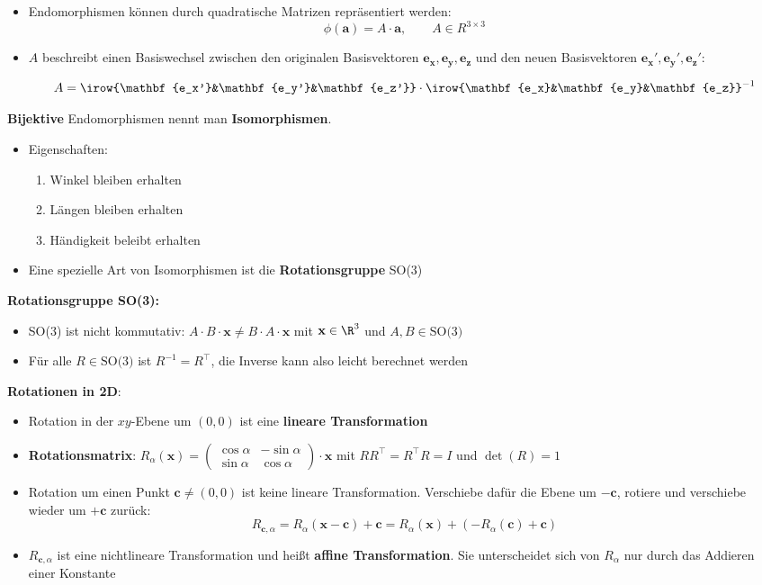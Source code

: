 \begin{itemize}
	\item Endomorphismen können durch quadratische Matrizen repräsentiert werden: $$\phi(\mathbf{a})=A\cdot\mathbf{a},\qquad A\in R^{3\times 3}$$
	\item $A$ beschreibt einen Basiswechsel zwischen den originalen Basisvektoren $\mathbf{e_x}, \mathbf{e_y}, \mathbf{e_z}$ und den neuen Basisvektoren $\mathbf{e_x'}, \mathbf{e_y'}, \mathbf{e_z'}$:
	
	$$A=\irow{\mathbf{e_x'}&\mathbf{e_y'}&\mathbf{e_z'}}\cdot\irow{\mathbf{e_x}&\mathbf{e_y}&\mathbf{e_z}}^{-1}$$
\end{itemize}
\pagebreak

\textbf{Bijektive} Endomorphismen nennt man \textbf{Isomorphismen}.
\begin{itemize}
	\item Eigenschaften:
	\begin{enumerate}
		\item Winkel bleiben erhalten
		\item Längen bleiben erhalten
		\item Händigkeit beleibt erhalten
	\end{enumerate}
	\item Eine spezielle Art von Isomorphismen ist die \textbf{Rotationsgruppe} SO(3)
\end{itemize}
\medskip
\textbf{Rotationsgruppe SO(3):}
\begin{itemize}
	\item SO(3) ist nicht kommutativ: $A\cdot B\cdot \mathbf{x}\neq B\cdot A\cdot \mathbf{x}$ mit $\mathbf{x}\in\R^3$ und $A,B\in\text{SO(3)}$ 
	\item Für alle $R\in\text{SO(3)}$ ist $R^{-1}=R^\top$, die Inverse kann also leicht berechnet werden
\end{itemize}
\medskip
\textbf{Rotationen in 2D}:
\begin{itemize}
	\item Rotation in der $xy$-Ebene um $(0,0)$ ist eine \textbf{lineare Transformation}
	\item \textbf{Rotationsmatrix}: $R_\alpha(\mathbf{x})=
	\left(\begin{matrix}
		\cos\alpha & -\sin\alpha \\
		\sin\alpha & \cos\alpha 
	\end{matrix}\right)\cdot\mathbf{x}$
	mit $RR^\top=R^\top R=I$ und $\det(R)=1$
	\item Rotation um einen Punkt $\mathbf{c}\neq(0,0)$ ist keine lineare Transformation.
	Verschiebe dafür die Ebene um $-\mathbf{c}$, rotiere und verschiebe wieder um $+\mathbf{c}$ zurück:
	$$R_{\mathbf{c},\alpha}=R_\alpha(\mathbf{x}-\mathbf{c})+\mathbf{c}= R_\alpha(\mathbf{x})+(-R_\alpha(\mathbf{c})+\mathbf{c})$$
	\item $R_{\mathbf{c},\alpha}$ ist eine nichtlineare Transformation und heißt \textbf{affine Transformation}.
	Sie unterscheidet sich von $R_\alpha$ nur durch das Addieren einer Konstante
\end{itemize}

